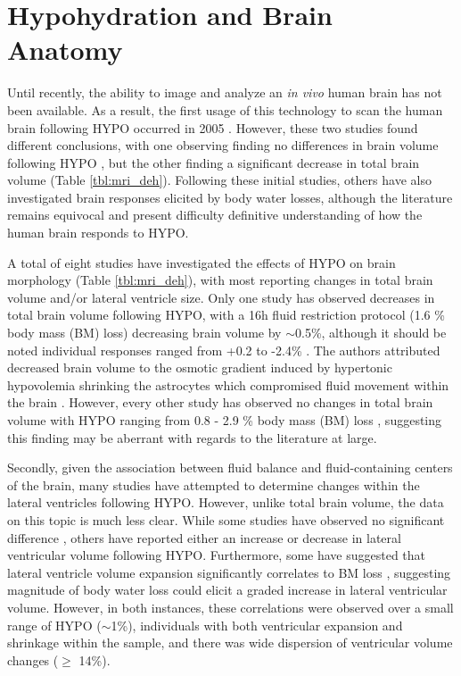 \section{Hypohydration and Brain Anatomy}
Until recently, the ability to image and analyze an \textit{in vivo} human brain has not been available. As a result, the first usage of this technology to scan the human brain following HYPO occurred in 2005 \cite{dickson_effects_2005, duning_dehydration_2005}. However, these two studies found different conclusions, with one observing finding no differences in brain volume following HYPO \cite{dickson_effects_2005}, but the other finding a significant decrease in total brain volume \cite{duning_dehydration_2005} (Table \ref{tbl:mri_deh}). Following these initial studies, others have also investigated brain responses elicited by body water losses, although the literature remains equivocal and present difficulty definitive understanding of how the human brain responds to HYPO. 

A total of eight studies have investigated the effects of HYPO on brain morphology (Table \ref{tbl:mri_deh}), with most reporting changes in total brain volume and/or lateral ventricle size. Only one study has observed decreases in total brain volume following HYPO, with a 16h fluid restriction protocol (1.6 \% body mass (BM) loss) decreasing brain volume by ${\sim}$0.5\%, although it should be noted individual responses ranged from +0.2 to -2.4\% \cite{duning_dehydration_2005}. The authors attributed decreased brain volume to the osmotic gradient induced by hypertonic hypovolemia shrinking the astrocytes which compromised fluid movement within the brain \cite{duning_dehydration_2005}. However, every other study has observed no changes in total brain volume with HYPO ranging from 0.8 - 2.9 \% body mass (BM) loss \cite{watson_effect_2010,kempton_effects_2009,kempton_dehydration_2011,meyers_does_2016}, suggesting this finding may be aberrant with regards to the literature at large.

Secondly, given the association between fluid balance and fluid-containing centers of the brain, many studies have attempted to determine changes within the lateral ventricles following HYPO. However, unlike total brain volume, the data on this topic is much less clear. While some studies have observed no significant difference \cite{meyers_does_2016, dickson_effects_2005, streitburger_investigating_2012,meyers_does_2016,dickson_effects_2005}, others have reported either an increase \cite{kempton_dehydration_2011,kempton_effects_2009} or decrease \cite{watson_effect_2010} in lateral ventricular volume following HYPO. Furthermore, some have suggested that lateral ventricle volume expansion significantly correlates to BM loss \cite{kempton_dehydration_2011, dickson_effects_2005}, suggesting magnitude of body water loss could elicit a graded increase in lateral ventricular volume. However, in both instances, these correlations were observed over a small range of HYPO (${\sim}$1\%), individuals with both ventricular expansion and shrinkage within the sample, and there was wide dispersion of ventricular volume changes (${\ge}$ 14\%). 

